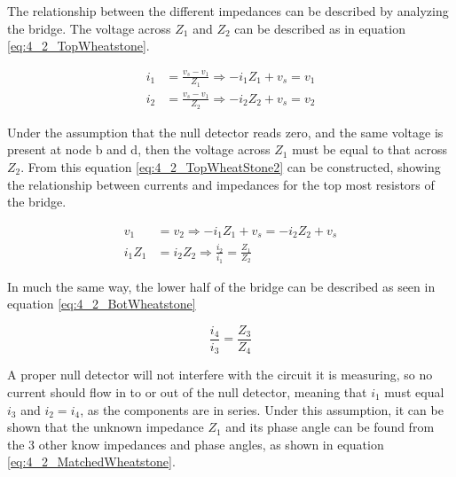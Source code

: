 The relationship between the different impedances can be described by analyzing the bridge. The voltage across $Z_1$ and $Z_2$ can
be described as in equation \ref*{eq:4_2_TopWheatstone}.

\begin{equation}
    \begin{split}
        \label{eq:4_2_TopWheatstone}
        i_1 &= \frac{v_s-v_1}{Z_1} \Rightarrow -i_1 Z_1 +v_s = v_1 \\
        i_2 &= \frac{v_s-v_1}{Z_2} \Rightarrow -i_2 Z_2 + v_s = v_2
    \end{split}
\end{equation}

Under the assumption that the null detector reads zero, and the same voltage is present at node b and d, then the voltage
across $Z_1$ must be equal to that across $Z_2$. From this equation \ref{eq:4_2_TopWheatStone2} can be constructed, showing the
relationship between currents and impedances for the top most resistors of the bridge.

\begin{equation}
    \begin{split}
        \label{eq:4_2_TopWheatStone2}
        v_1 &= v_2 \Rightarrow -i_1 Z_1 +v_s = -i_2 Z_2 + v_s \\
        i_1 Z_1 &= i_2 Z_2 \Rightarrow \frac{i_2}{i_1} = \frac{Z_1}{Z_2}
    \end{split}
\end{equation}

In much the same way, the lower half of the bridge can be described as seen in equation \ref{eq:4_2_BotWheatstone}

\begin{equation}
    \label{eq:4_2_BotWheatstone}
    \frac{i_4}{i_3} = \frac{Z_3}{Z_4}
\end{equation}

A proper null detector will not interfere with the circuit it is measuring, so no current should flow in to or out of the
null detector, meaning that $i_1$ must equal $i_3$ and $i_2 = i_4$, as the components are in series. Under this assumption, it can be
shown that the unknown impedance $Z_1$ and its phase angle can be found from the 3 other know impedances and phase angles, as shown
in equation \ref{eq:4_2_MatchedWheatstone}.

